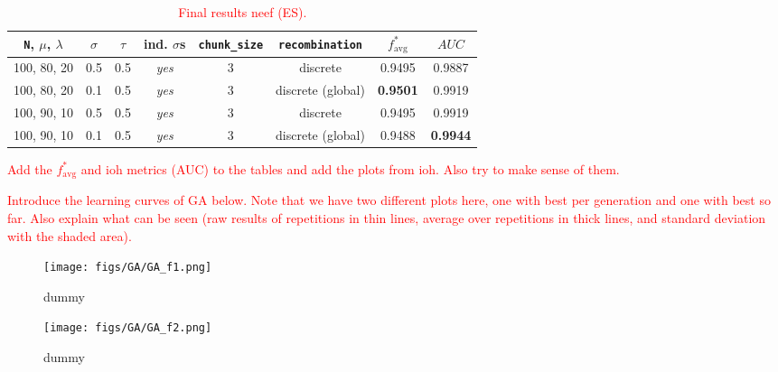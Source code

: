 \documentclass{article}
\newcommand{\todo}[1]{\textcolor{red}{#1}}
\begin{document}
\begin{table}[htbp]
    \centering
    \begin{tabular}{cccccc|cc}
        \toprule
        \texttt{N}, $\mu$, $\lambda$ & $\sigma$ & $\tau$ & ind. $\sigma$s & \texttt{chunk\_size} & \texttt{recombination}
            & $f^*_{\mathrm{avg}}$ & $AUC$ \\ %
        \midrule
        100, 80, 20  &  0.5  &  0.5  &  \textit{yes}  &  3  & discrete           &  0.9495           &  0.9887          \\
        100, 80, 20  &  0.1  &  0.5  &  \textit{yes}  &  3  & discrete (global)  &  \textbf{0.9501}  &  0.9919          \\
        100, 90, 10  &  0.5  &  0.5  &  \textit{yes}  &  3  & discrete           &  0.9495           &  0.9919          \\
        100, 90, 10  &  0.1  &  0.5  &  \textit{yes}  &  3  & discrete (global)  &  0.9488           & \textbf{ 0.9944} \\
        \bottomrule
    \end{tabular}
    \vspace{0.1cm}
    \caption{\todo{Final results neef (ES).}}
    \label{tab:ES_final_configs}
\end{table}


\todo{Add the $f^*_{\mathrm{avg}}$ and ioh metrics (AUC) to the tables and add the plots from ioh. Also try to make sense of them.}


\todo{Introduce the learning curves of GA below. Note that we have two different plots here, one with best per generation and one with best so far. Also explain what can be seen (raw results of repetitions in thin lines, average over repetitions in thick lines, and standard deviation with the shaded area).}

\begin{figure*}[htbp]
    \centering
    \texttt{[image: figs/GA/GA\_f1.png]}
    \captionsetup{width=.75\textwidth}
    \caption{dummy}
    \label{fig:GA_f1}
\end{figure*}

\begin{figure*}[htbp]
    \centering
    \texttt{[image: figs/GA/GA\_f2.png]}
    \captionsetup{width=.75\textwidth}
    \caption{dummy}
    \label{fig:GA_f2}
\end{figure*}

\newpage
\end{document}
